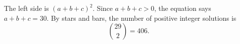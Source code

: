 The left side is $(a+b+c)^2$. Since $a+b+c>0$, the equation says $a+b+c=30$. By stars and bars, the number of positive integer solutions is
\[
\binom{29}{2}=\boxed{406}.
\]

